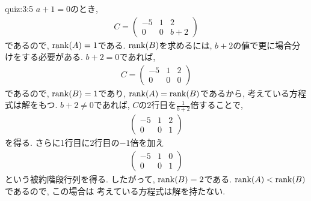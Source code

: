 \begin{answerof}{quiz:3:5}
  $a+1=0$のとき,
  \begin{align*}
    C=\begin{pmatrix}-5&1&2\\0&0&b+2\end{pmatrix}
  \end{align*}
  であるので, $\operatorname{rank}(A)=1$である.
  $\operatorname{rank}(B)$を求めるには, $b+2$の値で更に場合分けをする必要がある.
  $b+2=0$であれば,
  \begin{align*}
    C=\begin{pmatrix}-5&1&2\\0&0&0\end{pmatrix}
  \end{align*}
  であるので, $\operatorname{rank}(B)=1$であり, $\operatorname{rank}(A)=\operatorname{rank}(B)$であるから,
  考えている方程式は解をもつ.
  $b+2\neq 0$であれば,
  $C$の2行目を$\frac{1}{b+2}$倍することで,
  \begin{align*}
    \begin{pmatrix}-5&1&2\\0&0&1\end{pmatrix}
  \end{align*}
  を得る. さらに1行目に2行目の$-1$倍を加え
  \begin{align*}
    \begin{pmatrix}-5&1&0\\0&0&1\end{pmatrix}
  \end{align*}
  という被約階段行列を得る.
  したがって, $\operatorname{rank}(B)=2$である.
  $\operatorname{rank}(A)<\operatorname{rank}(B)$であるので,
  この場合は
  考えている方程式は解を持たない.
\end{answerof}

